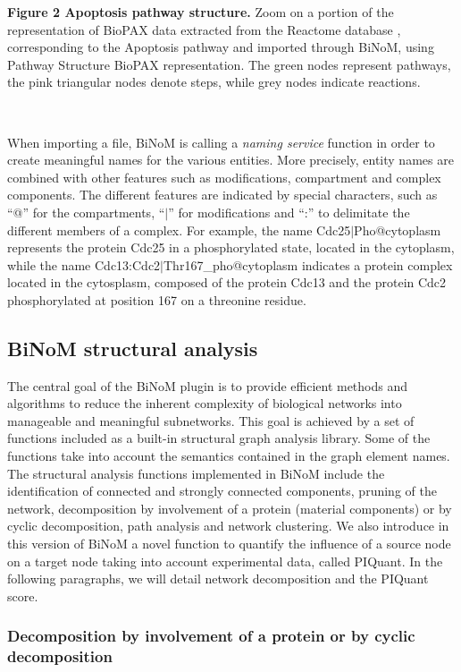 \documentclass[11pt]{bmc_article_s50}
\newenvironment{bmcformat}{\begin{raggedright}\baselineskip20pt\sloppy\setboolean{publ}{false}}{\end{raggedright}\baselineskip20pt\sloppy}
\begin{document}
\begin{bmcformat}
\textbf{Figure 2 Apoptosis pathway structure.}
Zoom on a portion of the representation of BioPAX data extracted from the Reactome database
\cite{joshi2005reactome}, corresponding to the Apoptosis pathway and imported through
BiNoM, using Pathway Structure BioPAX representation. The green nodes represent pathways, the pink
triangular nodes denote steps, while grey nodes indicate reactions.

\vspace*{-23pt}

\hrulefill\

When importing a file, BiNoM is calling a \emph{naming service} function in
order to create meaningful names for the various entities. More precisely,
entity names are combined with other features such as modifications, compartment
and complex components. The different features are indicated by special
characters, such as ``@'' for the compartments, ``$|$'' for modifications and
``:'' to delimitate the different members of a complex. For example, the
name Cdc25$|$Pho@cytoplasm represents the protein Cdc25 in a phosphorylated
state, located in the cytoplasm, while the name
Cdc13:Cdc2$|$Thr167\_pho@cytoplasm indicates a protein complex located in the
cytosplasm, composed of the protein Cdc13 and the protein Cdc2 phosphorylated at
position 167 on a threonine residue.


\subsection*{BiNoM structural analysis}
The central goal of the BiNoM plugin is to provide efficient methods
and algorithms to reduce the inherent complexity of biological networks into
manageable and meaningful subnetworks. This goal is achieved by a set of
functions included as a built-in structural graph analysis library. Some of the functions take into
account the semantics contained in the graph element names.
The structural analysis functions implemented in BiNoM include the identification of
connected and strongly connected components, pruning of the network, decomposition
by involvement of a protein (material components) or by cyclic decomposition, path analysis and network clustering.
We also introduce in this version of BiNoM a novel function to quantify the
influence of a source node on a target node taking into account experimental
data, called PIQuant. In the following paragraphs, we will detail network
decomposition and the PIQuant score.

\subsubsection*{Decomposition by involvement of a protein or by cyclic decomposition}


\end{bmcformat}
\end{document}

